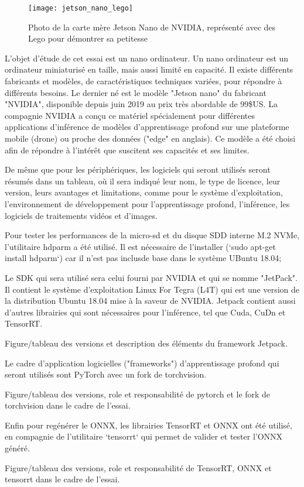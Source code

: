 ﻿
\label{jetson_nano_lego}
\begin{figure}[H]
    \centering
    \texttt{[image: jetson\_nano\_lego]}
    \caption{Photo de la carte mère Jetson Nano de NVIDIA, représenté avec des Lego pour démontrer sa petitesse}
    \label{fig:jetson_nano_lego}
\end{figure}
\par L'objet d'étude de cet essai est un nano ordinateur. Un nano ordinateur est un ordinateur miniaturisé en taille, mais aussi limité en capacité. Il existe différents fabricants et modèles, de caractéristiques techniques variées, pour répondre à différents besoins. Le dernier né est le modèle "Jetson nano" du fabricant "NVIDIA", disponible depuis juin 2019 au prix très abordable de 99\$US. La compagnie NVIDIA a conçu ce matériel spécialement pour différentes applications d'inférence de modèles d'apprentissage profond sur une plateforme mobile (drone) ou proche des données ("edge" en anglais). Ce modèle a été choisi afin de répondre à l'intérêt que suscitent ses capacités et ses limites. 
\par De même que pour les périphériques, les logiciels qui seront utilisés seront résumés dans un tableau, où il sera indiqué leur nom, le type de licence, leur version, leurs avantages et limitations, comme pour le système d'exploitation, l'environnement de développement pour l'apprentissage profond, l'inférence, les logiciels de traitements vidéos et d'images. 
\par Pour tester les performances de la micro-sd et du disque SDD interne M.2 NVMe, l'utilitaire hdparm a été utilisé. Il est nécessaire de l'installer (`sudo apt-get install hdparm`) car il n'est pas inclusde base dans le système UBuntu 18.04;
\par Le SDK qui sera utilisé sera celui fourni par NVIDIA et qui se nomme "JetPack". Il contient le système d'exploitation Linux For Tegra (L4T) qui est une version de la distribution Ubuntu 18.04 mise à la saveur de NVIDIA. Jetpack contient aussi d'autres librairies qui sont nécessaires pour l'inférence, tel que Cuda, CuDn et TensorRT.
\par Figure/tableau des versions et description des éléments du framework Jetpack.
\par Le cadre d'application logicielles ("frameworks") d’apprentissage profond qui seront utilisés sont PyTorch avec un fork de torchvision.
\par Figure/tableau des versions, role et responsabilité de pytorch et le fork de torchvision dans le cadre de l'essai.
\par Enfin pour regénérer le ONNX, les librairies TensorRT et ONNX ont été utilisé, en compagnie de l'utilitaire `tensorrt` qui permet de valider et tester l'ONNX généré.
\par Figure/tableau des versions, role et responsabilité de TensorRT, ONNX et tensorrt dans le cadre de l'essai.

